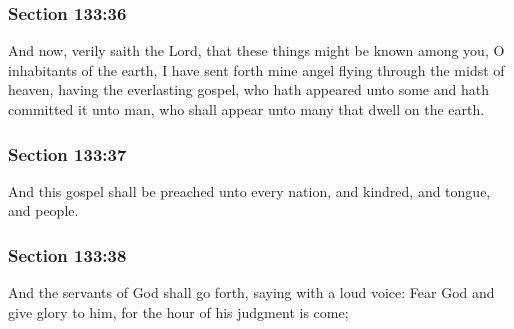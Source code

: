	\subsubsection{Section 133:36} %
		\label{DC133-36}

		And now, verily saith the Lord, that these things might be known among you, O inhabitants of the earth, I have sent forth mine angel flying through the midst of heaven, having the everlasting gospel, who hath appeared unto some and hath committed it unto man, who shall appear unto many that dwell on the earth.


	\subsubsection{Section 133:37} %
		\label{DC133-37}

		And this gospel shall be preached unto every nation, and kindred, and tongue, and people.


	\subsubsection{Section 133:38} %
		\label{DC133-38}

		And the servants of God shall go forth, saying with a loud voice: Fear God and give glory to him, for the hour of his judgment is come;


